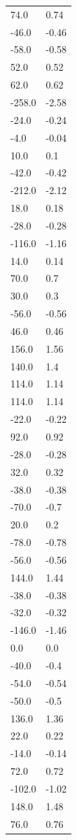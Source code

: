 \begin{longtable}{ll}
74.0 & 0.74 \\
-46.0 & -0.46 \\
-58.0 & -0.58 \\
52.0 & 0.52 \\
62.0 & 0.62 \\
-258.0 & -2.58 \\
-24.0 & -0.24 \\
-4.0 & -0.04 \\
10.0 & 0.1 \\
-42.0 & -0.42 \\
-212.0 & -2.12 \\
18.0 & 0.18 \\
-28.0 & -0.28 \\
-116.0 & -1.16 \\
14.0 & 0.14 \\
70.0 & 0.7 \\
30.0 & 0.3 \\
-56.0 & -0.56 \\
46.0 & 0.46 \\
156.0 & 1.56 \\
140.0 & 1.4 \\
114.0 & 1.14 \\
114.0 & 1.14 \\
-22.0 & -0.22 \\
92.0 & 0.92 \\
-28.0 & -0.28 \\
32.0 & 0.32 \\
-38.0 & -0.38 \\
-70.0 & -0.7 \\
20.0 & 0.2 \\
-78.0 & -0.78 \\
-56.0 & -0.56 \\
144.0 & 1.44 \\
-38.0 & -0.38 \\
-32.0 & -0.32 \\
-146.0 & -1.46 \\
0.0 & 0.0 \\
-40.0 & -0.4 \\
-54.0 & -0.54 \\
-50.0 & -0.5 \\
136.0 & 1.36 \\
22.0 & 0.22 \\
-14.0 & -0.14 \\
72.0 & 0.72 \\
-102.0 & -1.02 \\
148.0 & 1.48 \\
76.0 & 0.76 \\

\end{longtable}

